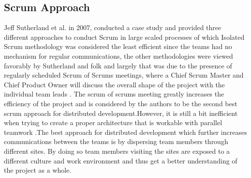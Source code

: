 \documentclass[sigplan,screen]{acmart}
\begin{document}
\begin {comment}
Block comment for the sake of removing this section and expanding the next one.
\subsection{Selecting Team Members}
The main responsibility of the manager of a project is to create a cohesive group of teams and organize them so they can work together effectively. Due to budget constraints and lack of specific skills, companies outsource teams from different regions and managers do not have the complete say in the process of team selection. The problem arises when individuals are motivated by their own work and who have their own ideas about how technical problems should be solved. The manager should select teams and their members based on having similar complementary personalities and not rely solely on technical capabilities. Individuals who are interaction-oriented help facilitate communication within the team and are the key in holding the sanity of the entire team together \cite{Somerville}. \\
When building a team, each participant's potential contribution to the process has to be evaluated.The ideal team member is a part of the team and identifies himself/herself with the team's goals, represents colleagues and has the time to participate through the entire process \cite{Gautam17}.\\
The key factors to select the team members are education,\\
training, application domain, technology experience, communication ability, adaptability and problem solving skills \cite{Somerville}.  
\end{comment}

\subsection{Scrum Approach}
Jeff Sutherland et al. in 2007, conducted a case study and provided three different approaches to conduct Scrum in large scaled processes of which Isolated Scrum methodology was considered the least efficient since the teams had no mechanism for regular communications, the other methodologies were viewed favorably by Sutherland and folk and largely that was due to the presence of regularly scheduled Scrum of Scrums meetings, where a Chief Scrum Master and Chief Product Owner will discuss the overall shape of the project with the individual team leads \cite{Jeff}. The scrum of scrums meeting greatly increases the efficiency of the project and is considered by the authors to be the second best scrum approach for distributed development.However, it is still a bit inefficient when trying to create a proper architecture that is workable with parallel teamwork \cite{Dingsoyr}.The best approach for distributed development which further increases communications between the teams is by dispersing team members through different sites. By doing so team members visiting the sites are exposed to a different culture and work environment and thus get a better understanding of the project as a whole.
\end{document}
